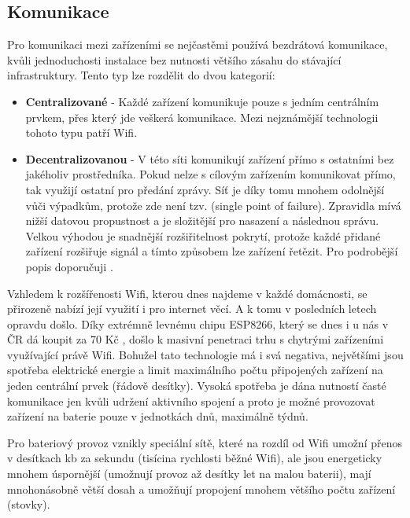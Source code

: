 \subsection{Komunikace}    %
Pro komunikaci mezi zařízeními se nejčastěmi používá bezdrátová komunikace, kvůli jednoduchosti instalace bez nutnosti většího zásahu do stávající infrastruktury. Tento typ lze rozdělit do dvou kategorií:
\begin{itemize}
    \item \textbf{Centralizované} - Každé zařízení komunikuje pouze s jedním centrálním prvkem, přes který jde veškerá komunikace. Mezi nejznámější technologii tohoto typu patří Wifi.
    \item \textbf{Decentralizovanou} - V této síti komunikují zařízení přímo s ostatními bez jakéholiv prostředníka. Pokud nelze s cílovým zařízením komunikovat přímo, tak využijí ostatní pro předání zprávy. Síť je díky tomu mnohem odolnější vůči výpadkům, protože zde není tzv.  (single point of failure). Zpravidla mívá nižší datovou propustnost a je složitější pro nasazení a následnou správu. Velkou výhodou je snadnější rozšiřitelnost pokrytí, protože každé přidané zařízení rozšiřuje signál a tímto způsobem lze zařízení řetězit. Pro podrobější popis doporučuji \cite{mesh}.
\end{itemize}
Vzhledem k rozšířenosti Wifi, kterou dnes najdeme v každé domácnosti, se přirozeně nabízí její využití i pro internet věcí. A k tomu v posledních letech opravdu došlo. Díky extrémně levnému chipu ESP8266, který se dnes i u nás v ČR dá koupit za 70 Kč \cite{hadex}, došlo k masivní penetraci trhu s chytrými zařízeními využívající právě Wifi. Bohužel tato technologie má i svá negativa, největšími jsou spotřeba elektrické energie a limit maximálního počtu připojených zařízení na jeden centrální prvek (řádově desítky). Vysoká spotřeba je dána nutností časté komunikace jen kvůli udržení aktivního spojení a proto je možné provozovat zařízení na baterie pouze v jednotkách dnů, maximálně týdnů.

Pro bateriový provoz vznikly speciální sítě, které na rozdíl od Wifi umožní přenos v desítkach kb za sekundu (tisícina rychlosti běžné Wifi), ale jsou energeticky mnohem úspornější \cite{Wifi-vs-ble} (umožnují provoz až desítky let na malou baterii), mají mnohonásobně větší dosah a umožňují propojení mnohem většího počtu zařízení (stovky).

